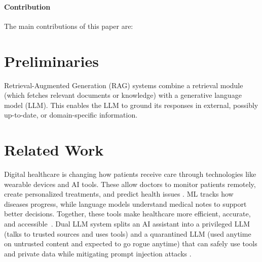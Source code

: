 \documentclass[conference, anonymous]{IEEEtran}
\begin{document}
\paragraph{Contribution}

The main contributions of this paper are: \newline


\section{Preliminaries}
\label{sec:preliminaries}

Retrieval-Augmented Generation (RAG) systems combine a retrieval module (which fetches relevant documents or knowledge) with a generative language model (LLM). This enables the LLM to ground its responses in external, possibly up-to-date, or domain-specific information. \cite{zhou2025privacyaware}

\section{Related Work}
\label{sec:relatedwork}

Digital healthcare is changing how patients receive care through technologies like wearable devices and AI tools. These allow doctors to monitor patients remotely, create personalized treatments, and predict health issues \cite{jeddi2020remote}. ML tracks how diseases progress, while language models understand medical notes to support better decisions. Together, these tools make healthcare more efficient, accurate, and accessible~\cite{shen2024large}. Dual LLM system splits an AI assistant into a privileged LLM (talks to trusted sources and uses tools) and a quarantined LLM (used anytime on untrusted content and expected to go rogue anytime) that can safely use tools and private data while mitigating prompt injection attacks \cite{willison2023dual}.


\end{document}
